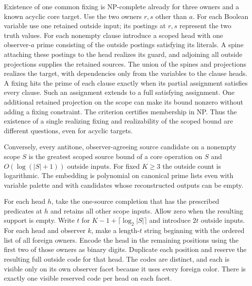 Existence of one common fixing is NP-complete
already for three owners and a known acyclic core
target. Use the two owners $r,s$ other than $a$.
For each Boolean variable use one retained outside
input; its postings at $r,s$ represent the two
truth values. For each nonempty clause introduce
a scoped head with one observer-$a$ prime
consisting of the outside postings satisfying its
literals. A spine attaching these postings to the
head realizes its guard, and adjoining all outside
projections supplies the retained sources. The
union of the spines and projections realizes the
target, with dependencies only from the variables
to the clause heads. A fixing hits the prime of
each clause exactly when its partial assignment
satisfies every clause. Such an assignment extends
to a full satisfying assignment. One additional
retained projection on the scope can make its
bound nonzero without adding a fixing constraint.
The criterion certifies membership in NP.
Thus the existence of a single realizing fixing
and realizability of the scoped bound are different
questions, even for acyclic targets.

Conversely, every antitone, observer-agreeing
source candidate on a nonempty scope $S$ is the
greatest scoped source bound of a core operation
on $S$ and $O(\log(|S|+1))$ outside inputs.
For fixed $K\geq3$ the outside count is logarithmic.
The embedding is polynomial on canonical prime
lists even with variable palette and with candidates
whose reconstructed outputs can be empty.

For each head $h$, take the one-source completion
that has the prescribed predicates at $h$ and
retains all other scope inputs. Allow zero when
the resulting support is empty. Write $t$ for
$K-1+\lceil\log_2|S|\rceil$ and introduce $2t$
outside inputs. For each head and observer $k$,
make a length-$t$ string beginning with the ordered
list of all foreign owners. Encode the head in
the remaining positions using the first two of
those owners as binary digits. Duplicate each
position and reserve the resulting full outside
code for that head. The codes are distinct,
and each is visible only on its own observer
facet because it uses every foreign color.
There is exactly one visible reserved code per
head on each facet.


